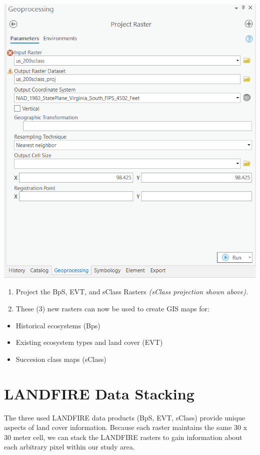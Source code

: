 \documentclass[
]{book}
\providecommand{\tightlist}{%
  \setlength{\itemsep}{0pt}\setlength{\parskip}{0pt}}
\begin{document}
\includegraphics[width=1000px]{04_gis_screenshots/5_raster_project}

\begin{enumerate}
\def\labelenumi{\arabic{enumi}.}
\setcounter{enumi}{2}
\tightlist
\item
  Project the BpS, EVT, and sClass Rasters \emph{(sClass projection shown above).}
\item
  These (3) new rasters can now be used to create GIS maps for:
\end{enumerate}

\begin{itemize}
\tightlist
\item
  Historical ecosystems (Bps)
\item
  Existing ecosystem types and land cover (EVT)
\item
  Succesion class maps (sClass)
\end{itemize}

\hypertarget{landfire-data-stacking}{%
\section{LANDFIRE Data Stacking}\label{landfire-data-stacking}}

The three used LANDFIRE data products (BpS, EVT, sClass) provide unique aspects of land cover information. Because each raster maintains the same 30 x 30 meter cell, we can stack the LANDFIRE rasters to gain information about each arbitrary pixel within our study area.
\end{document}
